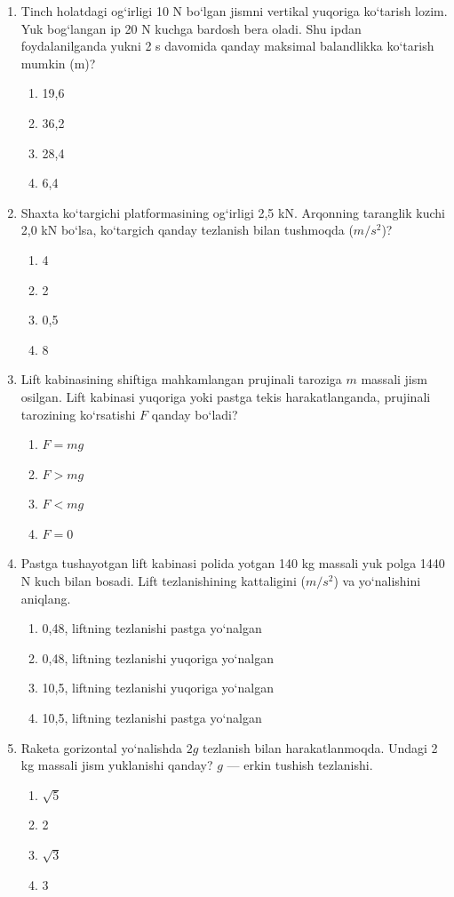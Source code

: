 \begin{enumerate}
\item Tinch holatdagi og‘irligi 10 N bo‘lgan jismni vertikal yuqoriga ko‘tarish lozim. Yuk bog‘langan ip 20 N kuchga bardosh bera oladi. Shu ipdan foydalanilganda yukni 2 s davomida qanday maksimal balandlikka ko‘tarish mumkin (m)?
\begin{enumerate}[label=\Alph*)]
\item 19,6
\item 36,2
\item 28,4
\item 6,4
\end{enumerate}

\item Shaxta ko‘targichi platformasining og‘irligi 2,5 kN. Arqonning taranglik kuchi 2,0 kN bo‘lsa, ko‘targich qanday tezlanish bilan tushmoqda ($m/s^2$)?
\begin{enumerate}[label=\Alph*)]
\item 4
\item 2
\item 0,5
\item 8
\end{enumerate}

\item Lift kabinasining shiftiga mahkamlangan prujinali taroziga $m$ massali jism osilgan. Lift kabinasi yuqoriga yoki pastga tekis harakatlanganda, prujinali tarozining ko‘rsatishi $F$ qanday bo‘ladi?
\begin{enumerate}[label=\Alph*)]
\item $F = mg$
\item $F > mg$
\item $F < mg$
\item $F = 0$
\end{enumerate}

\item Pastga tushayotgan lift kabinasi polida yotgan 140 kg massali yuk polga 1440 N kuch bilan bosadi. Lift tezlanishining kattaligini ($m/s^2$) va yo‘nalishini aniqlang.
\begin{enumerate}[label=\Alph*)]
\item 0,48, liftning tezlanishi pastga yo‘nalgan
\item 0,48, liftning tezlanishi yuqoriga yo‘nalgan
\item 10,5, liftning tezlanishi yuqoriga yo‘nalgan
\item 10,5, liftning tezlanishi pastga yo‘nalgan
\end{enumerate}

\item Raketa gorizontal yo‘nalishda $2g$ tezlanish bilan harakatlanmoqda. Undagi 2 kg massali jism yuklanishi qanday? $g$ — erkin tushish tezlanishi.
\begin{enumerate}[label=\Alph*)]
\item $\sqrt{5}$
\item 2
\item $\sqrt{3}$
\item 3
\end{enumerate}


\end{enumerate}
